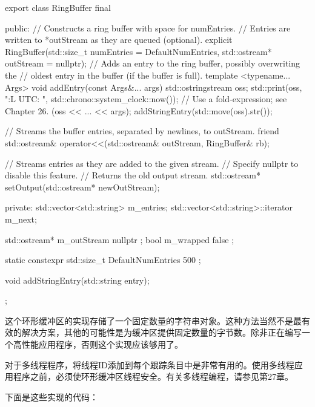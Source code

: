 \begin{cpp}
export class RingBuffer final
{
    public:
        // Constructs a ring buffer with space for numEntries.
        // Entries are written to *outStream as they are queued (optional).
        explicit RingBuffer(std::size_t numEntries = DefaultNumEntries,
            std::ostream* outStream = nullptr);
        // Adds an entry to the ring buffer, possibly overwriting the
        // oldest entry in the buffer (if the buffer is full).
        template <typename... Args>
        void addEntry(const Args&... args)
        {
            std::ostringstream oss;
            std::print(oss, "{:L} UTC: ", std::chrono::system_clock::now());
            // Use a fold-expression; see Chapter 26.
            (oss << ... << args);
            addStringEntry(std::move(oss).str());
        }

        // Streams the buffer entries, separated by newlines, to outStream.
        friend std::ostream& operator<<(std::ostream& outStream, RingBuffer& rb);

        // Streams entries as they are added to the given stream.
        // Specify nullptr to disable this feature.
        // Returns the old output stream.
        std::ostream* setOutput(std::ostream* newOutStream);

    private:
        std::vector<std::string> m_entries;
        std::vector<std::string>::iterator m_next;

        std::ostream* m_outStream { nullptr };
        bool m_wrapped { false };

        static constexpr std::size_t DefaultNumEntries { 500 };

        void addStringEntry(std::string entry);
};
\end{cpp}


这个环形缓冲区的实现存储了一个固定数量的字符串对象。这种方法当然不是最有效的解决方案，其他的可能性是为缓冲区提供固定数量的字节数。除非正在编写一个高性能应用程序，否则这个实现应该够用了。

对于多线程程序，将线程ID添加到每个跟踪条目中是非常有用的。使用多线程应用程序之前，必须使环形缓冲区线程安全。有关多线程编程，请参见第27章。

下面是这些实现的代码：

